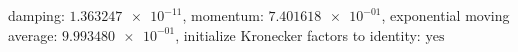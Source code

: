 damping: $\num[scientific-notation=true]{1.363247e-11}$, momentum: $\num[scientific-notation=true]{7.401618e-01}$, exponential moving average: $\num[scientific-notation=true]{9.993480e-01}$, initialize Kronecker factors to identity: $\text{yes}$